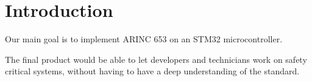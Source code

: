 \chapter{Introduction}\label{ch:introduction}

Our main goal is to implement ARINC 653 on an STM32 microcontroller.

The final product would be able to let developers and technicians work on safety critical systems,
 without having to have a deep understanding of the standard.
